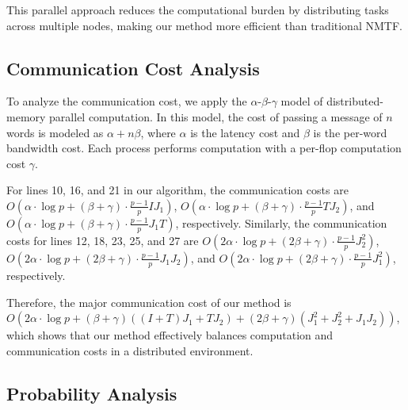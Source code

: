 \documentclass[journal]{IEEEtran}
\begin{document}
This parallel approach reduces the computational burden by distributing tasks across multiple nodes, making our method more efficient than traditional NMTF.

\subsection{Communication Cost Analysis}

To analyze the communication cost, we apply the $\alpha$-$\beta$-$\gamma$ model of distributed-memory parallel computation. In this model, the cost of passing a message of $n$ words is modeled as $\alpha + n\beta$, where $\alpha$ is the latency cost and $\beta$ is the per-word bandwidth cost. Each process performs computation with a per-flop computation cost $\gamma$.


For lines 10, 16, and 21 in our algorithm, the communication costs are $O(\alpha \cdot \log p + (\beta + \gamma) \cdot \frac{p-1}{p} IJ_1)$, $O(\alpha \cdot \log p + (\beta + \gamma) \cdot \frac{p-1}{p} TJ_2)$, and $O(\alpha \cdot \log p + (\beta + \gamma) \cdot \frac{p-1}{p} J_1T)$, respectively. Similarly, the communication costs for lines 12, 18, 23, 25, and 27 are $O(2\alpha \cdot \log p + (2\beta + \gamma) \cdot \frac{p-1}{p} J_2^2)$, $O(2\alpha \cdot \log p + (2\beta + \gamma) \cdot \frac{p-1}{p} J_1J_2)$, and $O(2\alpha \cdot \log p + (2\beta + \gamma) \cdot \frac{p-1}{p} J_1^2)$, respectively.

Therefore, the major communication cost of our method is $O(2\alpha \cdot \log p + (\beta + \gamma)((I + T)J_1 + TJ_2) + (2\beta + \gamma)(J_1^2 + J_2^2 + J_1J_2))$, which shows that our method effectively balances computation and communication costs in a distributed environment.

\subsection{Probability Analysis}
\end{document}
